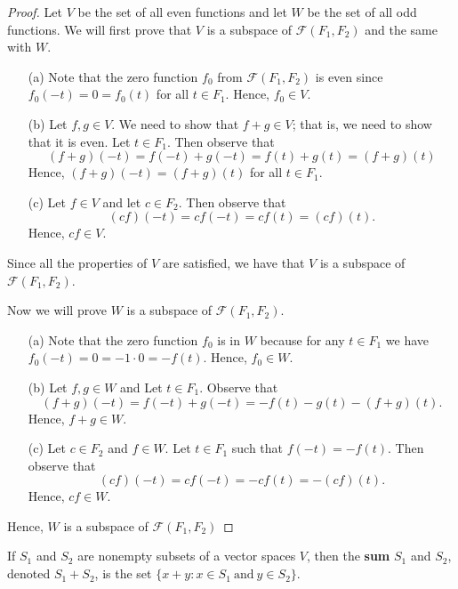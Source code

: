 \begin{proof}
    Let \( V  \) be the set of all even functions and let \( W  \) be the set of all odd functions. We will first prove that \( V  \) is a subspace of \( \mathcal{F}(F_{1}, F_{2})  \) and the same with \( W  \).
    \begin{enumerate}
        \item[(a)] Note that the zero function \( f_{0}  \) from \( \mathcal{F}(F_{1}, F_{2})  \) is even since \( f_{0}(-t) = 0 = f_{0}(t)  \) for all \( t \in F_{1}   \). Hence, \( f_{0} \in V  \).
        \item[(b)] Let \( f,g \in V  \). We need to show that \( f+ g \in V   \); that is, we need to show that it is even. Let \( t \in F_{1}  \). Then observe that 
            \[  (f+g)(-t) = f(-t) + g(-t) = f(t) + g(t) = (f+g)(t)   \]
            Hence, \( (f+g)(-t) = (f+g)(t) \) for all \( t \in F_{1}  \).
        \item[(c)]  Let \( f \in V  \) and let \( c \in F_{2} \). Then observe that 
            \[  (cf)(-t) = c f(-t) = c f(t) = (cf)(t).  \]
            Hence, \( cf \in V  \).
    \end{enumerate}
    Since all the properties of \( V  \) are satisfied, we have that \( V  \) is a subspace of \( \mathcal{F}(F_{1}, F_{2})  \).
   
    Now we will prove \( W  \) is a subspace of \( \mathcal{F}(F_{1}, F_{2})  \).
    \begin{enumerate}
        \item[(a)] Note that the zero function \( f_{0}  \) is in \( W  \) because for any \( t \in F_{1}  \) we have \( f_{0}(-t) = 0 = -1 \cdot 0 = -f(t). \) Hence, \( f_{0} \in W  \).
        \item[(b)] Let \( f,g \in W  \) and Let \( t \in F_{1}  \). Observe that  
            \[  (f+g)(-t) = f(-t) + g(-t) = -f(t) - g(t) -(f+g)(t).  \]
            Hence, \( f+g \in W  \).
        \item[(c)] Let \( c \in F_{2}  \) and \( f \in W  \). Let \( t \in F_{1}  \) such that \( f(-t) = - f(t)  \). Then observe that 
            \[  (cf)(-t) = c f(-t) = - cf(t) = - (cf)(t).  \]
            Hence, \( cf \in W  \).
    \end{enumerate}
    Hence, \( W  \) is a subspace of \( \mathcal{F}(F_{1}, F_{2}) \)
\end{proof}


\begin{definition}
    If \( S_{1}  \) and \( S_{2}   \) are nonempty subsets of a vector spaces \( V  \), then the \textbf{sum} \( S_{1}  \) and \( S_{2}  \), denoted \( S_{1} + S_{2} \), is the set \( \{ x + y : x \in S_{1} \ \text{and} \  y \in S_{2}  \}  \).
\end{definition}

